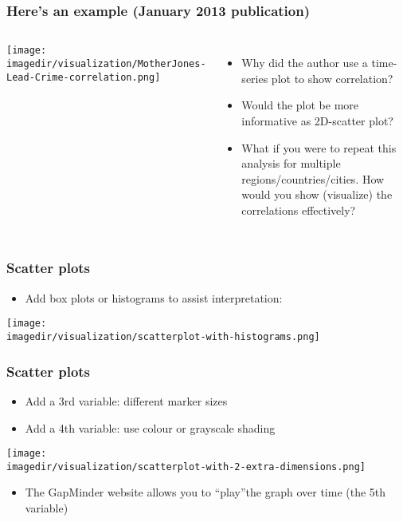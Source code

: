 \begin{frame}\frametitle{Here's an example (January 2013 publication)}
	\begin{columns}[t]
			\begin{center}
				\texttt{[image: \\imagedir/visualization/MotherJones-Lead-Crime-correlation.png]}
			\end{center}
			\begin{itemize}
				\item	Why did the author use a time-series plot to show correlation?
				\item	Would the plot be more informative as 2D-scatter plot?
				\item	What if you were to repeat this analysis for multiple regions/countries/cities. How would you show (visualize) the correlations effectively?
			\end{itemize}
	\end{columns}
	\vspace{-3pt}
\end{frame}

\begin{frame}\frametitle{Scatter plots}
	\begin{itemize}
		\item	Add box plots or histograms to assist interpretation: 
	\end{itemize}
	\begin{center}
		\texttt{[image: \\imagedir/visualization/scatterplot-with-histograms.png]}
	\end{center}
\end{frame}

\begin{frame}\frametitle{Scatter plots}
	\begin{itemize}
		\item	Add a 3rd variable: different marker sizes 
		\item	Add a 4th variable: use colour or grayscale shading 
	\end{itemize}
	\begin{center}
		\texttt{[image: \\imagedir/visualization/scatterplot-with-2-extra-dimensions.png]}
	\end{center}
	\begin{itemize}
		\item	The GapMinder website allows you to ``play''the graph over time (the 5th variable) 
	\end{itemize}
\end{frame}

